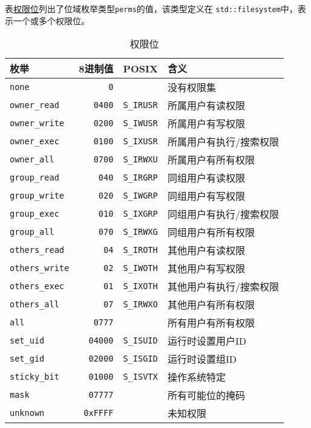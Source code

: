 表\hyperref[t20.14]{权限位}列出了位域枚举类型\texttt{perms}的值，该类型定义在
\texttt{std::filesystem}中，表示一个或多个权限位。
\begin{table}[htb]
    \centering
    \begin{tabular}{l|r|l|l}
        \hline
        \textbf{枚举}            & \textbf{8进制值}   & \textbf{POSIX}    & \textbf{含义}  \\
        \hline
        \texttt{none}          & \texttt{0}      &                   & 没有权限集        \\
        \texttt{owner\_read}   & \texttt{0400}   & \texttt{S\_IRUSR} & 所属用户有读权限     \\
        \texttt{owner\_write}  & \texttt{0200}   & \texttt{S\_IWUSR} & 所属用户有写权限     \\
        \texttt{owner\_exec}   & \texttt{0100}   & \texttt{S\_IXUSR} & 所属用户有执行/搜索权限 \\
        \texttt{owner\_all}    & \texttt{0700}   & \texttt{S\_IRWXU} & 所属用户有所有权限    \\
        \texttt{group\_read}   & \texttt{040}    & \texttt{S\_IRGRP} & 同组用户有读权限     \\
        \texttt{group\_write}  & \texttt{020}    & \texttt{S\_IWGRP} & 同组用户有写权限     \\
        \texttt{group\_exec}   & \texttt{010}    & \texttt{S\_IXGRP} & 同组用户有执行/搜索权限 \\
        \texttt{group\_all}    & \texttt{070}    & \texttt{S\_IRWXG} & 同组用户有所有权限    \\
        \texttt{others\_read}  & \texttt{04}     & \texttt{S\_IROTH} & 其他用户有读权限     \\
        \texttt{others\_write} & \texttt{02}     & \texttt{S\_IWOTH} & 其他用户有写权限     \\
        \texttt{others\_exec}  & \texttt{01}     & \texttt{S\_IXOTH} & 其他用户有执行/搜索权限 \\
        \texttt{others\_all}   & \texttt{07}     & \texttt{S\_IRWXO} & 其他用户有所有权限    \\
        \texttt{all}           & \texttt{0777}   &                   & 所有用户有所有权限    \\
        \texttt{set\_uid}      & \texttt{04000}  & \texttt{S\_ISUID} & 运行时设置用户ID    \\
        \texttt{set\_gid}      & \texttt{02000}  & \texttt{S\_ISGID} & 运行时设置组ID     \\
        \texttt{sticky\_bit}   & \texttt{01000}  & \texttt{S\_ISVTX} & 操作系统特定       \\
        \texttt{mask}          & \texttt{07777}  &                   & 所有可能位的掩码     \\
        \texttt{unknown}       & \texttt{0xFFFF} &                   & 未知权限         \\
        \hline
    \end{tabular}
    \caption{权限位}
    \label{t20.14}
\end{table}

